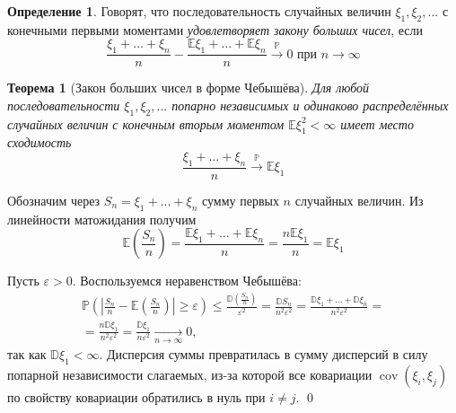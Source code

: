 \documentclass[oneside,final,14pt]{extreport}
\renewenvironment{proof}{{\bfseries Доказательство.}}{\qed}
\newtheorem{thm}{Теорема}[section]
\theoremstyle{definition}
\newtheorem{defn}{Определение}[section]
\begin{document}
\begin{defn}
    Говорят, что последовательность случайных величин $\xi_1, \xi_2, ...$ с конечными первыми моментами {\it удовлетворяет закону больших чисел}, если
    \begin{equation*}
        \frac{\xi_{1}+\ldots+\xi_{n}}{n}-\frac{\mathbb{E} \xi_{1}+\ldots+\mathbb{E} \xi_{n}}{n} \stackrel{\mathbb{P}}{\longrightarrow} 0 \text { при } n \rightarrow \infty
    \end{equation*}
\end{defn}
\begin{thm}[Закон больших чисел в форме Чебышёва]
    Для любой последовательности $\xi_1, \xi_2, ...$ попарно независимых и одинаково распределённых случайных величин с конечным вторым моментом $\mathbb{E}\xi_1^2 < \infty$ имеет место сходимость
    \begin{equation*}
        \frac{\xi_{1}+\ldots+\xi_{n}}{n} \stackrel{\mathbb{P}}{\longrightarrow} \mathbb{E} \xi_{1}
    \end{equation*}
\end{thm}
\begin{proof}
    Обозначим через $S_n = \xi_1 + ... + \xi_n$ сумму первых $n$ случайных величин. Из линейности матожидания получим
    \begin{equation*}
        \mathbb{E}\left(\frac{S_{n}}{n}\right)=\frac{\mathbb{E} \xi_{1}+\ldots+\mathbb{E} \xi_{n}}{n}=\frac{n \mathbb{E} \xi_{1}}{n}=\mathbb{E} \xi_{1}
    \end{equation*}
    
    Пусть $\varepsilon > 0.$ Воспользуемся неравенством Чебышёва:
    \begin{multline*}
        \mathbb{P}\left(\left|\frac{S_{n}}{n}-\mathbb{E}\left(\frac{S_{n}}{n}\right)\right| \geqslant \varepsilon\right) \leqslant \frac{\mathbb{D}\left(\frac{S_{n}}{n}\right)}{\varepsilon^{2}}
        = \frac{\mathbb{D} S_{n}}{n^{2} \varepsilon^{2}}
        = \frac{\mathbb{D} \xi_{1}+\ldots+\mathbb{D} \xi_{n}}{n^{2} \varepsilon^{2}}= \\
        = \frac{n \mathbb{D} \xi_{1}}{n^{2} \varepsilon^{2}}
        = \frac{\mathbb{D} \xi_{1}}{n \varepsilon^{2}} \xrightarrow[n \to \infty]{} 0,
    \end{multline*}
    так как $\mathbb{D}\xi_1 < \infty$. Дисперсия суммы превратилась в сумму дисперсий в силу попарной независимости слагаемых, из-за которой все ковариации $\operatorname{cov}(\xi_i, \xi_j)$ по свойству ковариации обратились в нуль при $i \neq j$.
\end{proof}
\end{document}
